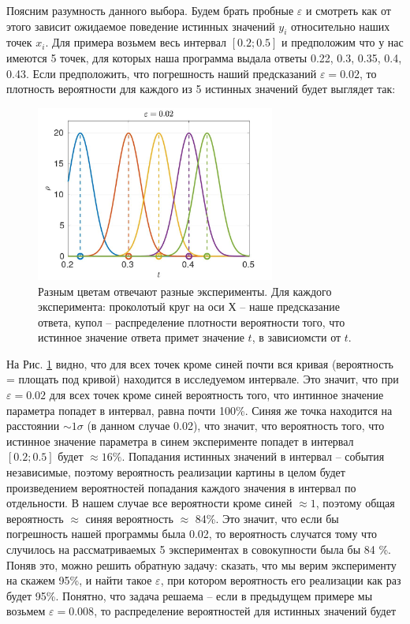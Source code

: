 \documentclass[a4paper,12pt]{article} %
\begin{document}
Поясним разумность данного выбора. Будем брать пробные $\varepsilon$ и смотреть как от этого зависит ожидаемое поведение истинных значений $y_i$ относительно наших точек $x_i$. Для примера возьмем весь интервал $[0.2; 0.5]$ и предположим что у нас имеются 5 точек, для которых наша программа выдала ответы 0.22, 0.3, 0.35, 0.4, 0.43. Если предположить, что погрешность наший предсказаний $\varepsilon = 0.02$, то плотность вероятности для каждого из 5 истинных значений будет выглядет так:

\begin{figure}[h!]
\begin{center}
\includegraphics[width=0.7\textwidth]{./pics/peaks_med}
\end{center}
\caption{Разным цветам отвечают разные эксперименты. Для каждого эксперимента: проколотый круг на оси Х -- наше предсказание ответа, купол -- распределение плотности вероятности того, что истинное значение ответа примет значение $t$, в зависиомсти от $t$.} \label{img:peaks_med}
\end{figure}

На Рис. \ref{img:peaks_med} видно, что для всех точек кроме синей почти вся кривая (вероятность = площать под кривой) находится в исследуемом интервале. Это значит, что при $\varepsilon = 0.02$ для всех точек кроме синей вероятность того, что интинное значение параметра попадет в интервал, равна почти 100\%. Синяя же точка находится на расстоянии $\sim 1 \sigma$ (в данном случае 0.02), что значит, что вероятность того, что истинное значение параметра в синем эксперименте попадет в интервал $[0.2; 0.5]$ будет $\approx 16 \%$. Попадания истинных значений в интервал -- события независимые, поэтому вероятность реализации картины в целом будет произведением вероятностей попадания каждого значения в интервал по отдельности. В нашем случае все вероятности кроме синей $\approx 1$, поэтому общая вероятность $\approx$ синяя вероятность $\approx$ 84\%. Это значит, что если бы погрешность нашей программы была 0.02, то вероятность случатся тому что случилось на рассматриваемых 5 экспериментах в совокупности была бы 84 \%. Поняв это, можно решить обратную задачу: сказать, что мы верим эксперименту на скажем 95\%, и найти такое $\varepsilon$, при котором вероятность его реализации как раз будет 95\%. Понятно, что задача решаема -- если в предыдущем примере мы возьмем $\varepsilon = 0.008$, то распределение вероятностей для истинных значений будет 
\end{document}
